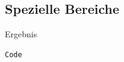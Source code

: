 \documentclass[ngerman,paper=a4,fontsize=8pt,headings=small,draft=no,parskip=half,noonelinecaption]{scrreprt}
\begin{document}
% 
% 
% 
% 
% 
% 
% 
% 

\clearpage
\subsection{Spezielle Bereiche}

\begin{minipage}{0.48\linewidth}
Ergebnis
\end{minipage}
\hspace{0.04\linewidth}
\begin{minipage}{0.48\linewidth}
\begin{lstlisting}
Code
\end{lstlisting}
\end{minipage}






\end{document}
